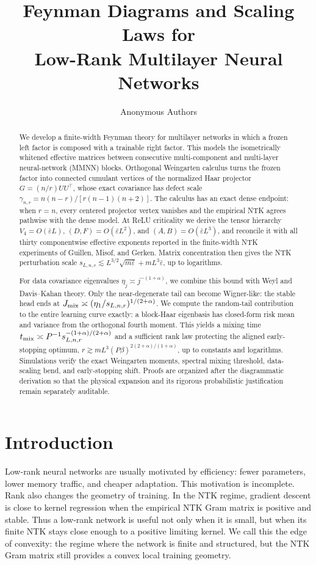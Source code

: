 \documentclass{article}
\title{Feynman Diagrams and Scaling Laws for\\
Low-Rank Multilayer Neural Networks}
\author{Anonymous Authors}
\begin{document}
\maketitle

\begin{abstract}
We develop a finite-width Feynman theory for multilayer networks in which a frozen left factor is composed with a trainable right factor.  This models the isometrically whitened effective matrices between consecutive multi-component and multi-layer neural-network (MMNN) blocks.  Orthogonal Weingarten calculus turns the frozen factor into connected cumulant vertices of the normalized Haar projector \(G=(n/r)UU^\top\), whose exact covariance has defect scale \(\gamma_{n,r}=n(n-r)/[r(n-1)(n+2)]\).  The calculus has an exact dense endpoint: when \(r=n\), every centered projector vertex vanishes and the empirical NTK agrees pathwise with the dense model.  At ReLU criticality we derive the tensor hierarchy \(V_4=O(\bar\varepsilon L)\), \((D,F)=O(\bar\varepsilon L^2)\), and \((A,B)=O(\bar\varepsilon L^3)\), and reconcile it with all thirty componentwise effective exponents reported in the finite-width NTK experiments of Guillen, Misof, and Gerken.  Matrix concentration then gives the NTK perturbation scale \(s_{L,n,r}\lesssim L^{3/2}\sqrt{m\bar\varepsilon}+mL^3\bar\varepsilon\), up to logarithms.

For data covariance eigenvalues \(\eta_j\asymp j^{-(1+\alpha)}\), we combine this bound with Weyl and Davis--Kahan theory.  Only the near-degenerate tail can become Wigner-like: the stable head ends at \(J_{\rm mix}\asymp (\eta_1/s_{L,n,r})^{1/(2+\alpha)}\).  We compute the random-tail contribution to the entire learning curve exactly: a block-Haar eigenbasis has closed-form risk mean and variance from the orthogonal fourth moment.  This yields a mixing time \(t_{\rm mix}\asymp P^{-1}s_{L,n,r}^{-(1+\alpha)/(2+\alpha)}\) and a sufficient rank law protecting the aligned early-stopping optimum, \(r\gtrsim mL^3(P\beta)^{2(2+\alpha)/(1+\alpha)}\), up to constants and logarithms.  Simulations verify the exact Weingarten moments, spectral mixing threshold, data-scaling bend, and early-stopping shift.  Proofs are organized after the diagrammatic derivation so that the physical expansion and its rigorous probabilistic justification remain separately auditable.
\end{abstract}

\section{Introduction}
Low-rank neural networks are usually motivated by efficiency: fewer parameters, lower memory traffic, and cheaper adaptation. This motivation is incomplete. Rank also changes the geometry of training. In the NTK regime, gradient descent is close to kernel regression when the empirical NTK Gram matrix is positive and stable. Thus a low-rank network is useful not only when it is small, but when its finite NTK stays close enough to a positive limiting kernel. We call this the edge of convexity: the regime where the network is finite and structured, but the NTK Gram matrix still provides a convex local training geometry.
\end{document}
